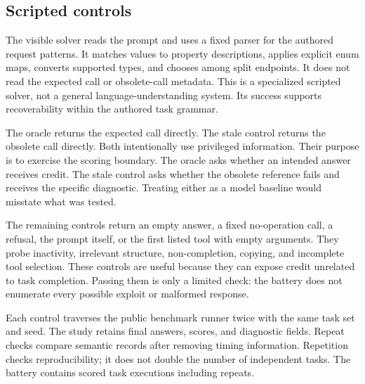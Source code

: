 \documentclass{article}
\begin{document}
\subsection{Scripted controls}
The visible solver reads the prompt and uses a fixed parser for the authored request patterns. It matches values to property descriptions, applies explicit enum maps, converts supported types, and chooses among split endpoints. It does not read the expected call or obsolete-call metadata. This is a specialized scripted solver, not a general language-understanding system. Its success supports recoverability within the authored task grammar.\par
The oracle returns the expected call directly. The stale control returns the obsolete call directly. Both intentionally use privileged information. Their purpose is to exercise the scoring boundary. The oracle asks whether an intended answer receives credit. The stale control asks whether the obsolete reference fails and receives the specific diagnostic. Treating either as a model baseline would misstate what was tested.\par
The remaining controls return an empty answer, a fixed no-operation call, a refusal, the prompt itself, or the first listed tool with empty arguments. They probe inactivity, irrelevant structure, non-completion, copying, and incomplete tool selection. These controls are useful because they can expose credit unrelated to task completion. Passing them is only a limited check: the battery does not enumerate every possible exploit or malformed response.\par
Each control traverses the public benchmark runner twice with the same task set and seed. The study retains final answers, scores, and diagnostic fields. Repeat checks compare semantic records after removing timing information. Repetition checks reproducibility; it does not double the number of independent tasks. The battery contains \BaselineCalls{} scored task executions including repeats.\par
\end{document}
